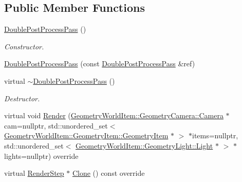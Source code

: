 \subsection*{Public Member Functions}
\begin{DoxyCompactItemize}
\item 
\mbox{\label{class_geometry_engine_1_1_geometry_render_step_1_1_double_post_process_pass_ab728b7a036fa4d3be7d57b150a2b6d4d}} 
\mbox{\hyperlink{class_geometry_engine_1_1_geometry_render_step_1_1_double_post_process_pass_ab728b7a036fa4d3be7d57b150a2b6d4d}{Double\+Post\+Process\+Pass}} ()
\begin{DoxyCompactList}\small\item\em Constructor. \end{DoxyCompactList}\item 
\mbox{\hyperlink{class_geometry_engine_1_1_geometry_render_step_1_1_double_post_process_pass_a497f2ab80bdcc0409cdb801069b87a93}{Double\+Post\+Process\+Pass}} (const \mbox{\hyperlink{class_geometry_engine_1_1_geometry_render_step_1_1_double_post_process_pass}{Double\+Post\+Process\+Pass}} \&ref)
\item 
\mbox{\label{class_geometry_engine_1_1_geometry_render_step_1_1_double_post_process_pass_ac8ccb94909421b605a2a01e6824ca03c}} 
virtual \mbox{\hyperlink{class_geometry_engine_1_1_geometry_render_step_1_1_double_post_process_pass_ac8ccb94909421b605a2a01e6824ca03c}{$\sim$\+Double\+Post\+Process\+Pass}} ()
\begin{DoxyCompactList}\small\item\em Destructor. \end{DoxyCompactList}\item 
virtual void \mbox{\hyperlink{class_geometry_engine_1_1_geometry_render_step_1_1_double_post_process_pass_a45e346852e7c86c257af98f85ddba9f9}{Render}} (\mbox{\hyperlink{class_geometry_engine_1_1_geometry_world_item_1_1_geometry_camera_1_1_camera}{Geometry\+World\+Item\+::\+Geometry\+Camera\+::\+Camera}} $\ast$cam=nullptr, std\+::unordered\+\_\+set$<$ \mbox{\hyperlink{class_geometry_engine_1_1_geometry_world_item_1_1_geometry_item_1_1_geometry_item}{Geometry\+World\+Item\+::\+Geometry\+Item\+::\+Geometry\+Item}} $\ast$ $>$ $\ast$items=nullptr, std\+::unordered\+\_\+set$<$ \mbox{\hyperlink{class_geometry_engine_1_1_geometry_world_item_1_1_geometry_light_1_1_light}{Geometry\+World\+Item\+::\+Geometry\+Light\+::\+Light}} $\ast$ $>$ $\ast$lights=nullptr) override
\item 
virtual \mbox{\hyperlink{class_geometry_engine_1_1_geometry_render_step_1_1_render_step}{Render\+Step}} $\ast$ \mbox{\hyperlink{class_geometry_engine_1_1_geometry_render_step_1_1_double_post_process_pass_a080175b6caf11b9b0e84b5c41c87d39a}{Clone}} () const override
\end{DoxyCompactItemize}
